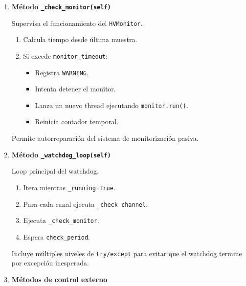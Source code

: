 \documentclass{article}
\begin{document}
\begin{enumerate}
Implementa transición segura a estado fail-safe.

\vspace{0.3cm}

\item \textbf{Método \texttt{\_check\_monitor(self)}}

Supervisa el funcionamiento del \texttt{HVMonitor}.

\begin{enumerate}

\item Calcula tiempo desde última muestra.
\item Si excede \texttt{monitor\_timeout}:
    \begin{itemize}
        \item Registra \texttt{WARNING}.
        \item Intenta detener el monitor.
        \item Lanza un nuevo thread ejecutando \texttt{monitor.run()}.
        \item Reinicia contador temporal.
    \end{itemize}
\end{enumerate}

Permite autorreparación del sistema de monitorización pasiva.

\vspace{0.3cm}

\item \textbf{Método \texttt{\_watchdog\_loop(self)}}

Loop principal del watchdog.

\begin{enumerate}

\item Itera mientras \texttt{\_running=True}.
\item Para cada canal ejecuta \texttt{\_check\_channel}.
\item Ejecuta \texttt{\_check\_monitor}.
\item Espera \texttt{check\_period}.
\end{enumerate}

Incluye múltiples niveles de \texttt{try/except} para evitar que el watchdog termine por excepción inesperada.

\vspace{0.3cm}

\item \textbf{Métodos de control externo}

\begin{enumerate}


\end{enumerate}
\end{enumerate}
\end{document}
